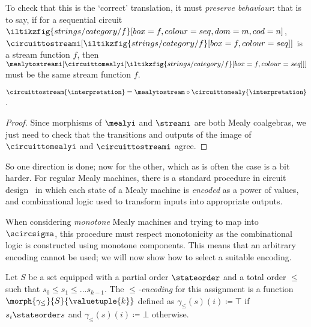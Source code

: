 To check that this is the `correct' translation, it must
\emph{preserve behaviour}: that is to say, if for a sequential circuit \(
    \iltikzfig{strings/category/f}[box=f,colour=seq,dom=m,cod=n]
\), \(
    \circuittostreami[
        \iltikzfig{strings/category/f}[box=f,colour=seq]
    ]
\) is a stream function \(f\), then \(
    \mealytostreami[
        \circuittomealyi[
            \iltikzfig{strings/category/f}[box=f,colour=seq]
        ]
    ]
\) must be the same stream function \(f\).

\begin{theorem}\label{thm:mealy-preserves-behaviour}
    \(
        \circuittostream{\interpretation}
        =
        \mealytostream \circ \circuittomealy{\interpretation}
    \).
\end{theorem}
\begin{proof}
    Since morphisms of \(\mealyi\) and \(\streami\) are both Mealy
    coalgebras, we just need to check that the transitions and outputs of the
    image of \(\circuittomealyi\) and \(\circuittostreami\) agree.
\end{proof}

So one direction is done; now for the other, which as is often the case is
a bit harder.
For regular Mealy machines, there is a standard procedure in circuit
design~\cite{kohavi2009switching} in which each state of a Mealy machine is
\emph{encoded} as a power of values, and combinational logic used to transform
inputs into appropriate outputs.

\begin{example}
\end{example}

When considering \emph{monotone} Mealy machines and trying to map into
\(\scircsigma\), this procedure must respect monotonicity as the combinational
logic is constructed using monotone components.
This means that an arbitrary encoding cannot be used; we will now show how to
select a suitable encoding.

\begin{definition}[Encoding]\label{def:encoding}
    Let \(S\) be a set equipped with a partial order \(\stateorder\) and a total
    order \(\leq\) such that \(s_0 \leq s_1 \leq \dots s_{k-1}\).
    The \emph{\(\leq\)-encoding} for this assignment is a function
    \(\morph{\gamma_\leq}{S}{\valuetuple{k}}\) defined as
    \(\gamma_\leq(s)(i) \coloneqq \top\) if \(s_i \stateorder s\) and
    \(\gamma_\leq(s)(i) \coloneqq \bot\) otherwise.
\end{definition}

